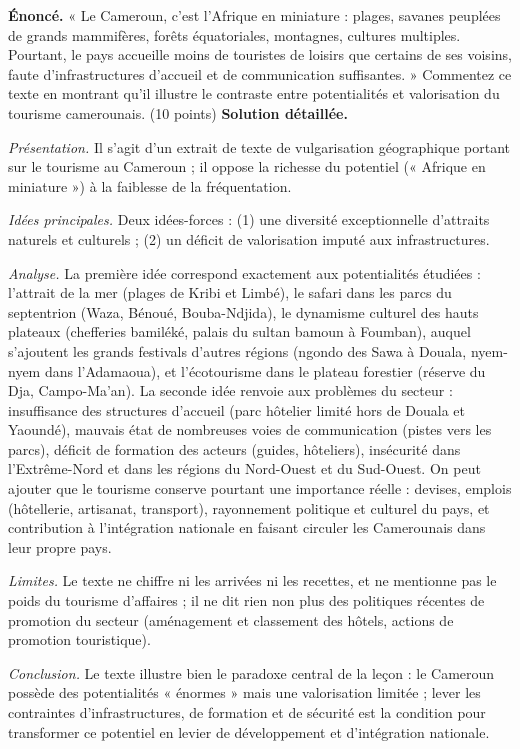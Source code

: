 \documentclass[11pt]{article}
\begin{document}
\begin{exoresolu}
\textbf{Énoncé.} « Le Cameroun, c'est l'Afrique en miniature : plages, savanes peuplées de grands mammifères, forêts équatoriales, montagnes, cultures multiples. Pourtant, le pays accueille moins de touristes de loisirs que certains de ses voisins, faute d'infrastructures d'accueil et de communication suffisantes. » Commentez ce texte en montrant qu'il illustre le contraste entre potentialités et valorisation du tourisme camerounais. (10 points)
\tcblower
\textbf{Solution détaillée.}

\emph{Présentation.} Il s'agit d'un extrait de texte de vulgarisation géographique portant sur le tourisme au Cameroun ; il oppose la richesse du potentiel (« Afrique en miniature ») à la faiblesse de la fréquentation.

\emph{Idées principales.} Deux idées-forces : (1) une diversité exceptionnelle d'attraits naturels et culturels ; (2) un déficit de valorisation imputé aux infrastructures.

\emph{Analyse.} La première idée correspond exactement aux potentialités étudiées : l'attrait de la mer (plages de Kribi et Limbé), le safari dans les parcs du septentrion (Waza, Bénoué, Bouba-Ndjida), le dynamisme culturel des hauts plateaux (chefferies bamiléké, palais du sultan bamoun à Foumban), auquel s'ajoutent les grands festivals d'autres régions (ngondo des Sawa à Douala, nyem-nyem dans l'Adamaoua), et l'écotourisme dans le plateau forestier (réserve du Dja, Campo-Ma'an). La seconde idée renvoie aux problèmes du secteur : insuffisance des structures d'accueil (parc hôtelier limité hors de Douala et Yaoundé), mauvais état de nombreuses voies de communication (pistes vers les parcs), déficit de formation des acteurs (guides, hôteliers), insécurité dans l'Extrême-Nord et dans les régions du Nord-Ouest et du Sud-Ouest. On peut ajouter que le tourisme conserve pourtant une importance réelle : devises, emplois (hôtellerie, artisanat, transport), rayonnement politique et culturel du pays, et contribution à l'intégration nationale en faisant circuler les Camerounais dans leur propre pays.

\emph{Limites.} Le texte ne chiffre ni les arrivées ni les recettes, et ne mentionne pas le poids du tourisme d'affaires ; il ne dit rien non plus des politiques récentes de promotion du secteur (aménagement et classement des hôtels, actions de promotion touristique).

\emph{Conclusion.} Le texte illustre bien le paradoxe central de la leçon : le Cameroun possède des potentialités « énormes » mais une valorisation limitée ; lever les contraintes d'infrastructures, de formation et de sécurité est la condition pour transformer ce potentiel en levier de développement et d'intégration nationale.
\end{exoresolu}
\end{document}
